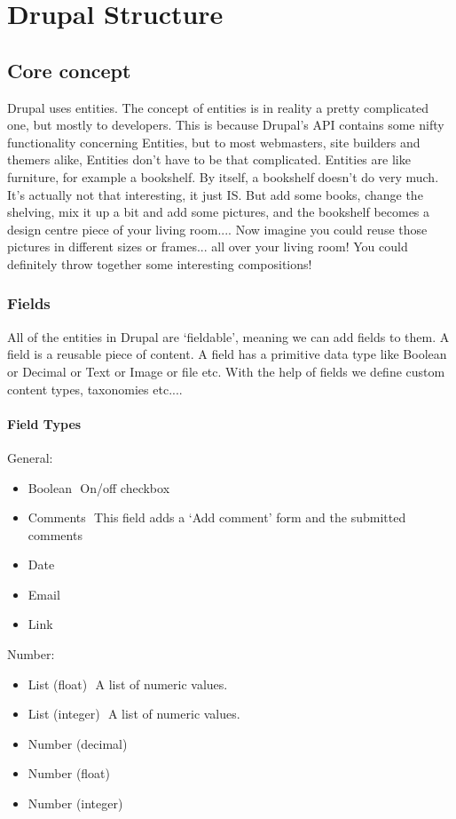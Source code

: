 \chapter{Drupal Structure}
\label{ch:drupal_structure}

\section{Core concept}
Drupal uses entities. The concept of entities is in reality a pretty complicated one, but mostly to developers. This is because Drupal’s API contains some nifty functionality concerning Entities, but to most webmasters, site builders and themers alike, Entities don’t have to be that complicated. 
Entities are like furniture, for example a bookshelf. By itself, a bookshelf doesn’t do very much. It’s actually not that interesting, it just IS. But add some books, change the shelving, mix it up a bit and add some pictures, and the bookshelf becomes a design centre piece of your living room.... Now imagine you could reuse those pictures in different sizes or frames... all over your living room! You could definitely throw together some interesting compositions! 
\subsection{Fields} 
All of the entities in Drupal are ‘fieldable’, meaning we can add fields to them. A field is a reusable piece of content. A field has a primitive data type like Boolean or Decimal or Text or Image or file etc. With the help of fields we define custom content types, taxonomies etc.... 

\subsubsection{Field Types} 
General: 
\begin{itemize}
    \item Boolean ­ On/off checkbox 
    \item Comments ­ This field adds a ‘Add comment’ form and the submitted comments 
    \item Date 
    \item E­mail 
    \item Link 
\end{itemize}

Number: 
\begin{itemize}  
    \item List (float) ­ A list of numeric values. 
    \item List (integer) ­ A list of numeric values. 
    \item Number (decimal) 
    \item Number (float) 
    \item Number (integer) 
\end{itemize}


